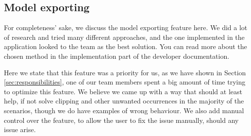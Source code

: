 \subsection{Model exporting}

For completeness' sake, we discuss the model exporting feature here. We did a lot of research and tried many different approaches, and the one implemented in the application looked to the team as the best solution. You can read more about the chosen method in the implementation part of the developer documentation.

Here we state that this feature was a priority for us, as we have shown in Section \ref{sec:responsibilities}, one of our team members spent a big amount of time trying to optimize this feature. We believe we came up with a way that should at least help, if not solve clipping and other unwanted occurrences in the majority of the scenarios, though we do have examples of wrong behaviour. We also add manual control over the feature, to allow the user to fix the issue manually, should any issue arise.




